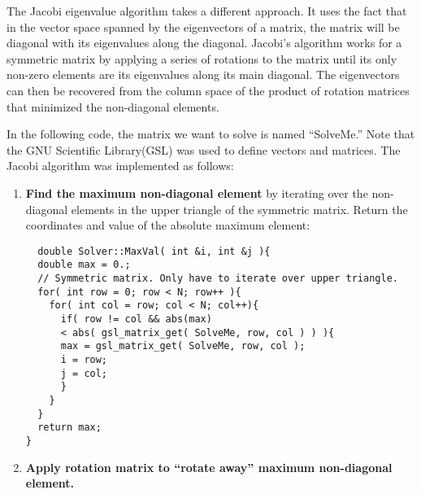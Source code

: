 \documentclass[a4paper,12pt]{report}
\begin{document}
The Jacobi eigenvalue algorithm takes a different approach. It uses the fact that in the vector space spanned by the eigenvectors of a matrix, the matrix will be diagonal with its eigenvalues along the diagonal. Jacobi's algorithm works for a symmetric matrix by applying a series of rotations to the matrix until its only non-zero elements are its eigenvalues along its main diagonal. The eigenvectors can then be recovered from the column space of the product of rotation matrices that minimized the non-diagonal elements. 

In the following code, the matrix we want to solve is named ``SolveMe.'' Note that the GNU Scientific Library(GSL)\cite{Galassi:2015} was used to define vectors and matrices. The Jacobi algorithm was implemented as follows:
\singlespacing
\begin{enumerate}
 \item \textbf{Find the maximum non-diagonal element} by iterating over the non-diagonal elements in the upper triangle of the symmetric matrix. Return the coordinates and value of the absolute maximum element:
 \begin{verbatim}
  double Solver::MaxVal( int &i, int &j ){
  double max = 0.;
  // Symmetric matrix. Only have to iterate over upper triangle.
  for( int row = 0; row < N; row++ ){
    for( int col = row; col < N; col++){
      if( row != col && abs(max) 
	  < abs( gsl_matrix_get( SolveMe, row, col ) ) ){
	  max = gsl_matrix_get( SolveMe, row, col );
	  i = row;
	  j = col;
      }
    }
  } 
  return max;
}
 \end{verbatim}

 \item \textbf{Apply rotation matrix to ``rotate away'' maximum non-diagonal element.} 
 

\end{enumerate}
\end{document}
